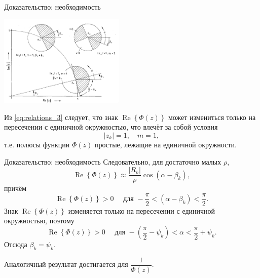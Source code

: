\documentclass[notheorems,aspectratio=169]{beamer}
\theoremstyle{definition}
\newcommand{\abs}[1]{\left| #1 \right|}
\newcommand{\paren}[1]{\left( #1 \right)}
\renewcommand{\Re}{\operatorname{Re}}
\begin{document}
\begin{frame}{Доказательство: необходимость}
  \begin{center}
    \includegraphics[width=6cm]{Poles}
  \end{center}

  Из \eqref{eq:relations_3} следует, что знак $\Re \left\{ \Phi(z) \right\}$
  может измениться только на пересечении с единичной окружностью, что влечёт за собой
  условия
  \begin{equation}
    \abs{z_k} = 1, \quad m = 1,
  \end{equation}
  т.е. полюсы функции $\Phi(z)$ простые, лежащие на единичной окружности.
\end{frame}

\begin{frame}{Доказательство: необходимость}
  Следовательно, для достаточно малых $\rho$,
  \begin{equation*}
    \Re \left\{\Phi(z)\right\} \approx \frac{\abs{R_{k}}}{\rho} \cos\paren{\alpha - \beta_k},
  \end{equation*}
  причём
  \begin{equation*}
    \Re \left\{ \Phi(z) \right\} > 0 \quad \mbox{ для } -\frac{\pi}{2} < \paren{\alpha - \beta_k} < \frac{\pi}{2}.
  \end{equation*}
  Знак $\Re \left\{ \Phi(z) \right\}$ изменяется только на пересечении с единичной окружностью, поэтому
  \begin{equation*}
    \Re \left\{ \Phi(z) \right\} > 0 \quad \mbox{ для } -\paren{\frac{\pi}{2} - \psi_k} < \alpha < \frac{\pi}{2} + \psi_k.
  \end{equation*}
  Отсюда $\beta_k = \psi_k$.

  Аналогичный результат достигается для $\dfrac{1}{\Phi(z)}$.
\end{frame}
\end{document}

